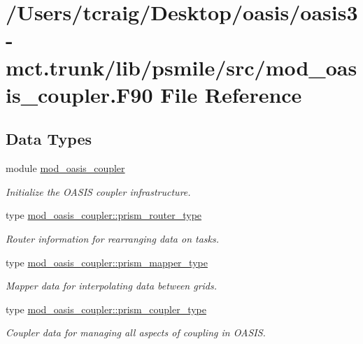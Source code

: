 \hypertarget{mod__oasis__coupler_8_f90}{\section{/\+Users/tcraig/\+Desktop/oasis/oasis3-\/mct.trunk/lib/psmile/src/mod\+\_\+oasis\+\_\+coupler.F90 File Reference}
\label{mod__oasis__coupler_8_f90}
}
\subsection*{Data Types}
\begin{DoxyCompactItemize}
\item 
module \hyperlink{classmod__oasis__coupler}{mod\+\_\+oasis\+\_\+coupler}
\begin{DoxyCompactList}\small\item\em Initialize the O\+A\+S\+I\+S coupler infrastructure. \end{DoxyCompactList}\item 
type \hyperlink{structmod__oasis__coupler_1_1prism__router__type}{mod\+\_\+oasis\+\_\+coupler\+::prism\+\_\+router\+\_\+type}
\begin{DoxyCompactList}\small\item\em Router information for rearranging data on tasks. \end{DoxyCompactList}\item 
type \hyperlink{structmod__oasis__coupler_1_1prism__mapper__type}{mod\+\_\+oasis\+\_\+coupler\+::prism\+\_\+mapper\+\_\+type}
\begin{DoxyCompactList}\small\item\em Mapper data for interpolating data between grids. \end{DoxyCompactList}\item 
type \hyperlink{structmod__oasis__coupler_1_1prism__coupler__type}{mod\+\_\+oasis\+\_\+coupler\+::prism\+\_\+coupler\+\_\+type}
\begin{DoxyCompactList}\small\item\em Coupler data for managing all aspects of coupling in O\+A\+S\+I\+S. \end{DoxyCompactList}\end{DoxyCompactItemize}
